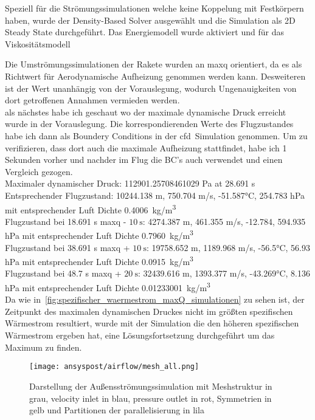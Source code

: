 Speziell für die Strömungssimulationen welche keine Koppelung mit Festkörpern haben, wurde der Density-Based Solver ausgewählt und die
Simulation als 2D Steady State durchgeführt. Das Energiemodell wurde aktiviert und für das Viskositätsmodell~\cite{Irving-2021}

Die Umströmungssimulationen der Rakete wurden an \ac{maxq} orientiert, da es als Richtwert für Aerodynamische Aufheizung genommen werden kann.
Desweiteren ist der Wert unanhängig von der Vorauslegung, wodurch Ungenauigkeiten von dort getroffenen Annahmen vermieden werden.\\


als nächstes habe ich geschaut wo der maximale dynamische Druck erreicht wurde in der Vorauslegung. Die korrespondierenden Werte des Flugzustandes
habe ich dann als Boundery Conditions in der \ac{cfd}~Simulation genommen.
Um zu verifizieren, dass dort auch die maximale Aufheizung stattfindet, habe ich 1 Sekunden vorher und nachder
im Flug die BC's auch verwendet und einen Vergleich gezogen.\\
Maximaler dynamischer Druck: 112901.25708461029 Pa at 28.691 s\\
Entsprechender Flugzustand: 10244.138 m, 750.704 m/s, -51.587°C, 254.783 hPa mit entsprechender Luft Dichte \SI{0.4006}{kg/m^3}\\
Flugzustand bei 18.691 s \ac{maxq} - $\SI{10}{\second}$: 4274.387 m, 461.355 m/s, -12.784, 594.935 hPa mit entsprechender Luft Dichte \SI{0.7960}{kg/m^3}\\
Flugzustand bei 38.691 s \ac{maxq} + $\SI{10}{\second}$: 19758.652 m, 1189.968 m/s, -56.5°C, 56.93 hPa mit entsprechender Luft Dichte \SI{0.0915}{kg/m^3}\\
Flugzustand bei 48.7 s \ac{maxq} + $\SI{20}{\second}$: 32439.616 m, 1393.377 m/s, -43.269°C, 8.136 hPa mit entsprechender Luft Dichte \SI{0.01233001}{kg/m^3}\\
Da wie in~\ref{fig:spezifischer_waermestrom_maxQ_simulationen} zu sehen ist, der Zeitpunkt des maximalen dynamischen Druckes nicht im größten spezifischen
Wärmestrom resultiert, wurde mit der Simulation die den höheren spezifischen Wärmestrom ergeben hat, eine Lösungsfortsetzung durchgeführt um das Maximum zu finden.\\

\begin{figure}[H]
  \centering
  \texttt{[image: ansyspost/airflow/mesh\_all.png]}
  \caption{Darstellung der Außensströmungssimulation mit Meshstruktur in grau, velocity inlet in blau, pressure outlet in rot, Symmetrien in gelb und Partitionen der parallelisierung in lila}\label{fig:aussenstroemung_mesh}
\end{figure}

